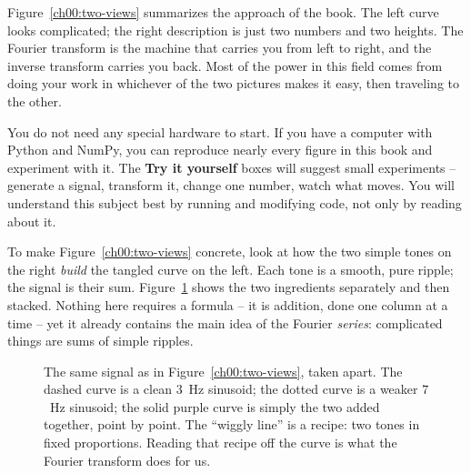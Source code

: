 Figure~\ref{ch00:two-views} summarizes the approach of the book. The left curve looks complicated; the
right description is just two numbers and two heights. The Fourier transform is the machine
that carries you from left to right, and the inverse transform carries you back. Most of the
power in this field comes from doing your work in whichever of the two pictures makes it easy,
then traveling to the other.

\begin{labbox}
You do not need any special hardware to start. If you have a computer with Python and NumPy,
you can reproduce nearly every figure in this book and experiment with it. The \textbf{Try it yourself} boxes will suggest small experiments -- generate a
signal, transform it, change one number, watch what moves. You will understand this subject best by
running and modifying code, not only by reading about it.
\end{labbox}

To make Figure~\ref{ch00:two-views} concrete, look at how the two simple tones
on the right \emph{build} the tangled curve on the left. Each tone is a smooth, pure
ripple; the signal is their sum. Figure~\ref{ch00:buildup} shows the two
ingredients separately and then stacked. Nothing here requires a formula -- it is addition,
done one column at a time -- yet it already contains the main idea of the Fourier \emph{series}:
complicated things are sums of simple ripples.

\begin{figure}[htbp]
\centering
{}
\caption{The same signal as in Figure~\ref{ch00:two-views}, taken apart. The dashed curve is a
clean $3$~Hz sinusoid; the dotted curve is a weaker $7$~Hz sinusoid; the solid purple curve is
simply the two added together, point by point. The ``wiggly line'' is a
recipe: two tones in fixed proportions. Reading that recipe off the curve is what the Fourier transform does for us.}
\label{ch00:buildup}
\end{figure}

